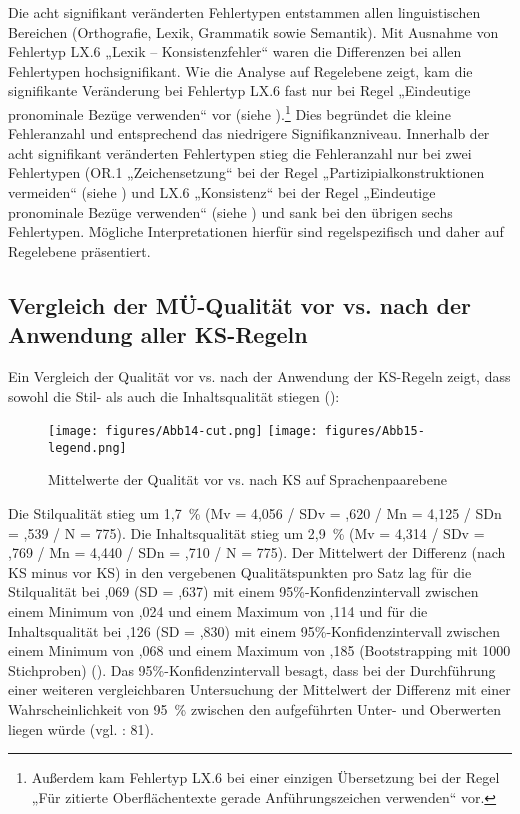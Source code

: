 Die acht signifikant veränderten Fehlertypen entstammen allen linguistischen Bereichen (Orthografie, Lexik, Grammatik sowie Semantik). Mit Ausnahme von Fehlertyp LX.6 „Lexik -- Konsistenzfehler“ waren die Differenzen bei allen Fehlertypen hochsignifikant. Wie die Analyse auf Regelebene zeigt, kam die signifikante Veränderung bei Fehlertyp LX.6 fast nur bei Regel „Eindeutige pronominale Bezüge verwenden“ vor (siehe ).\footnote{{{{Außerdem kam Fehlertyp LX.6 bei einer einzigen Übersetzung bei der Regel „Für zitierte Oberflächentexte gerade Anführungszeichen verwenden“ vor.}}} } Dies begründet die kleine Fehleranzahl und entsprechend das niedrigere Signifikanzniveau. Innerhalb der acht signifikant veränderten Fehlertypen stieg die Fehleranzahl nur bei zwei Fehlertypen (OR.1 „Zeichensetzung“ bei der Regel „Partizipialkonstruktionen vermeiden“ (siehe ) und LX.6 „Konsistenz“ bei der Regel „Eindeutige pronominale Bezüge verwenden“ (siehe ) und sank bei den übrigen sechs Fehlertypen. Mögliche Interpretationen hierfür sind regelspezifisch und daher auf Regelebene präsentiert.

\subsection{Vergleich der MÜ-Qualität vor vs. nach der Anwendung aller KS-Regeln}
\label{sec:5.2.5}
Ein Vergleich der Qualität vor vs. nach der Anwendung der KS-Regeln zeigt, dass sowohl die Stil- als auch die Inhaltsqualität stiegen ():


\begin{figure}
\texttt{[image: figures/Abb14-cut.png]}
\texttt{[image: figures/Abb15-legend.png]}
\caption{\label{fig:05:15} Mittelwerte der Qualität vor vs. nach KS auf Sprachenpaarebene}
\end{figure}

Die Stilqualität stieg um 1,7~\% (Mv = 4,056 / SDv = ,620 / Mn = 4,125 / SDn = ,539 / N = 775). Die Inhaltsqualität stieg um 2,9~\% (Mv = 4,314 / SDv = ,769 / Mn = 4,440 / SDn = ,710 / N = 775). Der Mittelwert der Differenz (nach KS minus vor KS) in den vergebenen Qualitätspunkten pro Satz lag für die Stilqualität bei ,069 (SD = ,637) mit einem 95\%-Konfidenzintervall zwischen einem Minimum von ,024 und einem Maximum von ,114 und für die Inhaltsqualität bei ,126 (SD = ,830) mit einem 95\%-Konfidenzintervall zwischen einem Minimum von ,068 und einem Maximum von ,185 (Bootstrapping mit 1000 Stichproben) (). Das 95\%-Konfidenzintervall besagt, dass bei der Durchführung einer weiteren vergleichbaren Untersuchung der Mittelwert der Differenz mit einer Wahrscheinlichkeit von 95~\% zwischen den aufgeführten Unter- und Oberwerten liegen würde (vgl. \citealt{Eckstein2008}: 81).


